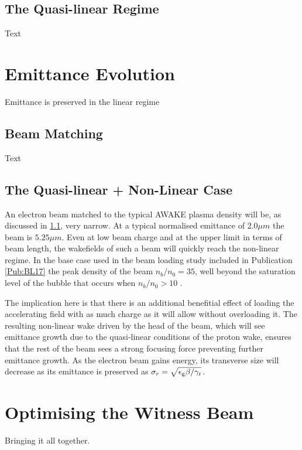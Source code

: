\subsection{The Quasi-linear Regime}
\label{Sim:QLin}

Text


\section{Emittance Evolution}
\label{Sim:Emitt}

Emittance is preserved in the linear regime


\subsection{Beam Matching}
\label{Sim:Match}

Text


\subsection{The Quasi-linear + Non-Linear Case}
\label{Sim:QLinNonLin}

An electron beam matched to the typical AWAKE plasma density will be, as discussed in \ref{Sim:Match}, very narrow. At a typical normalised emittance of $2.0\unit{\mu m}$ the beam is $5.25\unit{\mu m}$. Even at low beam charge and at the upper limit in terms of beam length, the wakefields of such a beam will quickly reach the non-linear regime. In the base case used in the beam loading study included in Publication \ref{Pub:BL17} \cite{berglyd_olsen:2017-1} the peak density of the beam $n_{b}/n_{0} = 35$, well beyond the saturation level of the bubble that occurs when $n_{b}/n_{0} > 10$ \cite{lu:2005}.

The implication here is that there is an additional benefitial effect of loading the accelerating field with as much charge as it will allow without overloading it. The resulting non-linear wake driven by the head of the beam, which will see emittance growth due to the quasi-linear conditions of the proton wake, ensures that the rest of the beam sees a strong focusing force preventing further emittance growth. As the electron beam gains energy, its transverse size will decrease as its emittance is preserved as $\sigma_{r} = \sqrt{\epsilon_{\mathrm{g}}\beta/\gamma_{\mathrm{r}}}$.


\section{Optimising the Witness Beam}
\label{Sim:Opt}

Bringing it all together.

